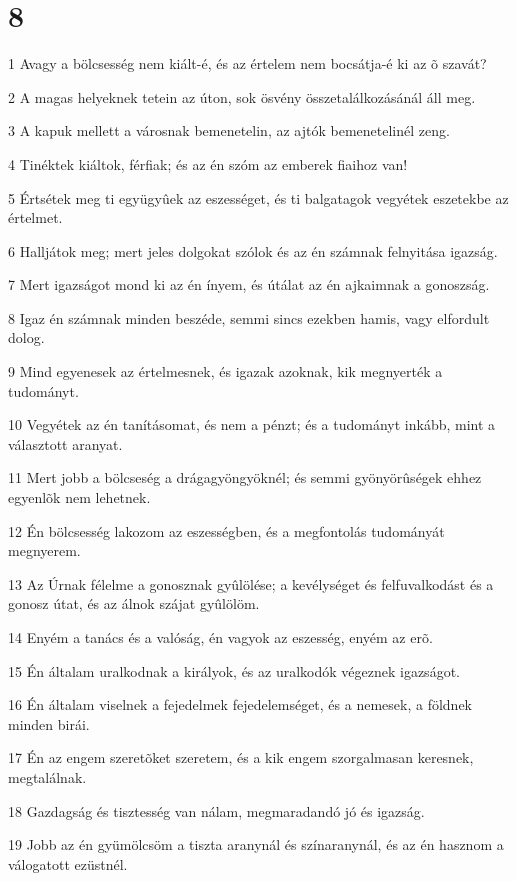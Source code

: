 \chapter{8}

\par 1 Avagy a bölcsesség nem kiált-é, és az értelem nem bocsátja-é ki az õ szavát?
\par 2 A magas helyeknek tetein az úton, sok ösvény összetalálkozásánál áll meg.
\par 3 A kapuk mellett a városnak bemenetelin, az ajtók bemenetelinél zeng.
\par 4 Tinéktek kiáltok, férfiak; és az én szóm az emberek fiaihoz van!
\par 5 Értsétek meg ti együgyûek az eszességet, és ti balgatagok vegyétek eszetekbe az értelmet.
\par 6 Halljátok meg; mert jeles dolgokat szólok és az én számnak felnyitása igazság.
\par 7 Mert igazságot mond ki az én ínyem, és útálat az én ajkaimnak a gonoszság.
\par 8 Igaz én számnak minden beszéde, semmi sincs ezekben hamis, vagy elfordult dolog.
\par 9 Mind egyenesek az értelmesnek, és igazak azoknak, kik megnyerték a tudományt.
\par 10 Vegyétek az én tanításomat, és nem a pénzt; és a tudományt inkább, mint a választott aranyat.
\par 11 Mert jobb a bölcseség a drágagyöngyöknél; és semmi gyönyörûségek ehhez egyenlõk nem lehetnek.
\par 12 Én bölcsesség lakozom az eszességben, és a megfontolás tudományát megnyerem.
\par 13 Az Úrnak félelme a gonosznak gyûlölése; a kevélységet és felfuvalkodást és a gonosz útat, és az álnok szájat gyûlölöm.
\par 14 Enyém a tanács és a valóság, én vagyok az eszesség, enyém az erõ.
\par 15 Én általam uralkodnak a királyok, és az uralkodók végeznek igazságot.
\par 16 Én általam viselnek a fejedelmek fejedelemséget, és a nemesek, a földnek minden birái.
\par 17 Én az engem szeretõket szeretem, és a kik engem szorgalmasan keresnek, megtalálnak.
\par 18 Gazdagság és tisztesség van nálam, megmaradandó jó és igazság.
\par 19 Jobb az én gyümölcsöm a tiszta aranynál és színaranynál, és az én hasznom a válogatott ezüstnél.
